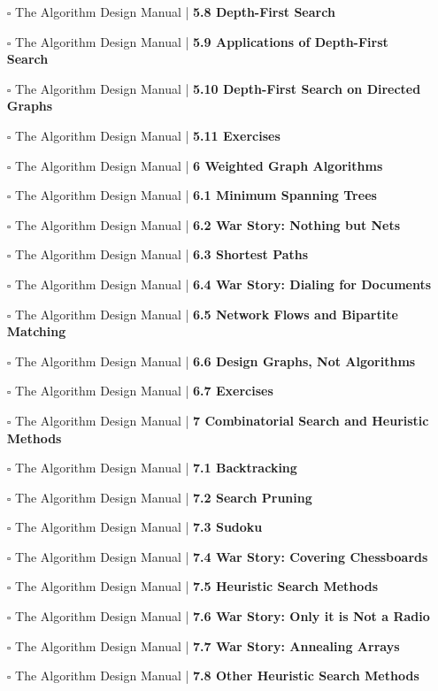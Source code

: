 \documentclass[a4, landscape, 12pt]{article}
\newcommand{\checkbox}{$\square$}%
\begin{document}
\begin{itemize}
{}
\item [\checkbox]  The Algorithm Design Manual | \textbf{ 5.8 Depth-First Search
}
\item [\checkbox]  The Algorithm Design Manual | \textbf{ 5.9 Applications of Depth-First Search
}
\item [\checkbox]  The Algorithm Design Manual | \textbf{ 5.10 Depth-First Search on Directed Graphs
}
\item [\checkbox]  The Algorithm Design Manual | \textbf{ 5.11 Exercises
}
\item [\checkbox]  The Algorithm Design Manual | \textbf{ 6 Weighted Graph Algorithms
}
\item [\checkbox]  The Algorithm Design Manual | \textbf{ 6.1 Minimum Spanning Trees
}
\item [\checkbox]  The Algorithm Design Manual | \textbf{ 6.2 War Story: Nothing but Nets
}
\item [\checkbox]  The Algorithm Design Manual | \textbf{ 6.3 Shortest Paths
}
\item [\checkbox]  The Algorithm Design Manual | \textbf{ 6.4 War Story: Dialing for Documents
}
\item [\checkbox]  The Algorithm Design Manual | \textbf{ 6.5 Network Flows and Bipartite Matching
}
\item [\checkbox]  The Algorithm Design Manual | \textbf{ 6.6 Design Graphs, Not Algorithms
}
\item [\checkbox]  The Algorithm Design Manual | \textbf{ 6.7 Exercises
}
\item [\checkbox]  The Algorithm Design Manual | \textbf{ 7 Combinatorial Search and Heuristic Methods
}
\item [\checkbox]  The Algorithm Design Manual | \textbf{ 7.1 Backtracking
}
\item [\checkbox]  The Algorithm Design Manual | \textbf{ 7.2 Search Pruning
}
\item [\checkbox]  The Algorithm Design Manual | \textbf{ 7.3 Sudoku
}
\item [\checkbox]  The Algorithm Design Manual | \textbf{ 7.4 War Story: Covering Chessboards
}
\item [\checkbox]  The Algorithm Design Manual | \textbf{ 7.5 Heuristic Search Methods
}
\item [\checkbox]  The Algorithm Design Manual | \textbf{ 7.6 War Story: Only it is Not a Radio
}
\item [\checkbox]  The Algorithm Design Manual | \textbf{ 7.7 War Story: Annealing Arrays
}
\item [\checkbox]  The Algorithm Design Manual | \textbf{ 7.8 Other Heuristic Search Methods
}
\end{itemize}
\end{document}
